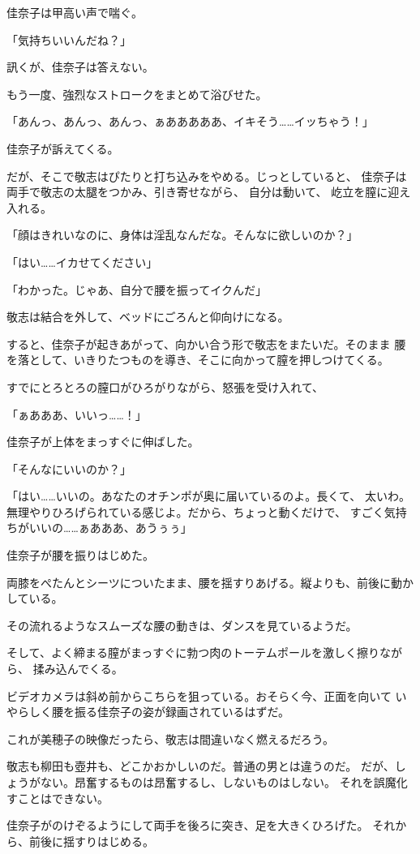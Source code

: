 ﻿\documentclass[
    book,tate,
    line_length=30zw,
    jafontsize=12pt,
    paper=b5j,
    landscape,
    ]{jlreq}
\begin{document}
佳奈子は甲高い声で喘ぐ。

「気持ちいいんだね？」

訊くが、佳奈子は答えない。

もう一度、強烈なストロークをまとめて浴びせた。

「あんっ、あんっ、あんっ、ぁあああああ、イキそう……イッちゃう！」

佳奈子が訴えてくる。

だが、そこで敬志はぴたりと打ち込みをやめる。じっとしていると、
佳奈子は両手で敬志の太腿をつかみ、引き寄せながら、 自分は動いて、
屹立を膣に迎え入れる。

「顔はきれいなのに、身体は淫乱なんだな。そんなに欲しいのか？」

「はい……イカせてください」

「わかった。じゃあ、自分で腰を振ってイクんだ」

敬志は結合を外して、ベッドにごろんと仰向けになる。

すると、佳奈子が起きあがって、向かい合う形で敬志をまたいだ。そのまま
腰を落として、いきりたつものを導き、そこに向かって膣を押しつけてくる。

すでにとろとろの膣口がひろがりながら、怒張を受け入れて、

「ぁあああ、いいっ……！」

佳奈子が上体をまっすぐに伸ばした。

「そんなにいいのか？」

「はい……いいの。あなたのオチンポが奥に届いているのよ。長くて、
太いわ。無理やりひろげられている感じよ。だから、ちょっと動くだけで、
すごく気持ちがいいの……ぁあああ、あうぅぅ」

佳奈子が腰を振りはじめた。

両膝をぺたんとシーツについたまま、腰を揺すりあげる。縦よりも、前後に動かしている。

その流れるようなスムーズな腰の動きは、ダンスを見ているようだ。

そして、よく締まる膣がまっすぐに勃つ肉のトーテムポールを激しく擦りながら、
揉み込んでくる。

ビデオカメラは斜め前からこちらを狙っている。おそらく今、正面を向いて
いやらしく腰を振る佳奈子の姿が録画されているはずだ。

これが美穂子の映像だったら、敬志は間違いなく燃えるだろう。

敬志も柳田も壺井も、どこかおかしいのだ。普通の男とは違うのだ。
だが、しょうがない。昂奮するものは昂奮するし、しないものはしない。
それを誤魔化すことはできない。

佳奈子がのけぞるようにして両手を後ろに突き、足を大きくひろげた。
それから、前後に揺すりはじめる。
\end{document}
